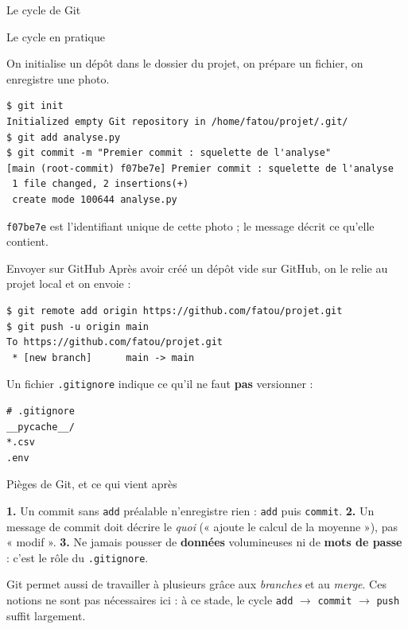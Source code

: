 \documentclass[aspectratio=169,11pt]{beamer}
\begin{document}
\begin{frame}{Le cycle de Git}
\end{frame}

\begin{frame}[fragile]{Le cycle en pratique}
\begin{ucadex}
{\small On initialise un dépôt dans le dossier du projet, on prépare un fichier, on enregistre une photo.}
\end{ucadex}
\begin{lstlisting}[style=sh]
$ git init
Initialized empty Git repository in /home/fatou/projet/.git/
$ git add analyse.py
$ git commit -m "Premier commit : squelette de l'analyse"
[main (root-commit) f07be7e] Premier commit : squelette de l'analyse
 1 file changed, 2 insertions(+)
 create mode 100644 analyse.py
\end{lstlisting}
{\small \texttt{f07be7e} est l'identifiant unique de cette photo ; le message décrit ce qu'elle contient.}
\end{frame}

\begin{frame}[fragile]{Envoyer sur GitHub}
{\small Après avoir créé un dépôt vide sur GitHub, on le relie au projet local et on envoie :}
\begin{lstlisting}[style=sh]
$ git remote add origin https://github.com/fatou/projet.git
$ git push -u origin main
To https://github.com/fatou/projet.git
 * [new branch]      main -> main
\end{lstlisting}
{\small Un fichier \texttt{.gitignore} indique ce qu'il ne faut \textbf{pas} versionner :}
\begin{lstlisting}[style=sh]
# .gitignore
__pycache__/
*.csv
.env
\end{lstlisting}
\end{frame}

\begin{frame}{Pièges de Git, et ce qui vient après}
\begin{ucadpiege}
{\small \textbf{1.} Un commit sans \texttt{add} préalable n'enregistre rien : \texttt{add} puis \texttt{commit}. \quad \textbf{2.} Un message de commit doit décrire le \emph{quoi} (« ajoute le calcul de la moyenne »), pas « modif ». \quad \textbf{3.} Ne jamais pousser de \textbf{données} volumineuses ni de \textbf{mots de passe} : c'est le rôle du \texttt{.gitignore}.}
\end{ucadpiege}
\begin{ucadfront}
{\small Git permet aussi de travailler à plusieurs grâce aux \emph{branches} et au \emph{merge}. Ces notions ne sont pas nécessaires ici : à ce stade, le cycle \texttt{add} $\rightarrow$ \texttt{commit} $\rightarrow$ \texttt{push} suffit largement.}
\end{ucadfront}
\end{frame}
\end{document}

